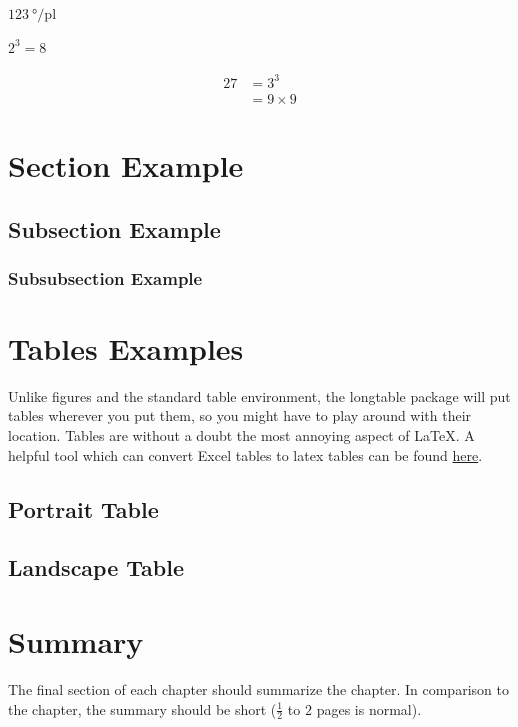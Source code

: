 $\SI{123}{\degree\per\pico\litre}$

    \begin{math}
        2^3=8
    \end{math}
    
    \begin{align}
        27 &= 3^3 \\
        &= 9 \times 9
    \end{align}
\section{Section Example}\label{sec:section_Example}
\subsection{Subsection Example}
\subsubsection{Subsubsection Example}
    
    
\section{Tables Examples}
Unlike figures and the standard table environment, the longtable package will put tables wherever you put them, so you might have to play around with their location. Tables are without a doubt the most annoying aspect of \LaTeX. A helpful tool which can convert Excel tables to latex tables can be found \href{https://github.com/krlmlr/Excel2LaTeX}{here}.

\newpage %
\subsection{Portrait Table}

\subsection{Landscape Table}

\section{Summary}
\label{s:Background-Summary}

The final section of each chapter should summarize the chapter. In comparison to the chapter, the summary should be short ($\frac{1}{2}$ to $2$ pages is normal).


